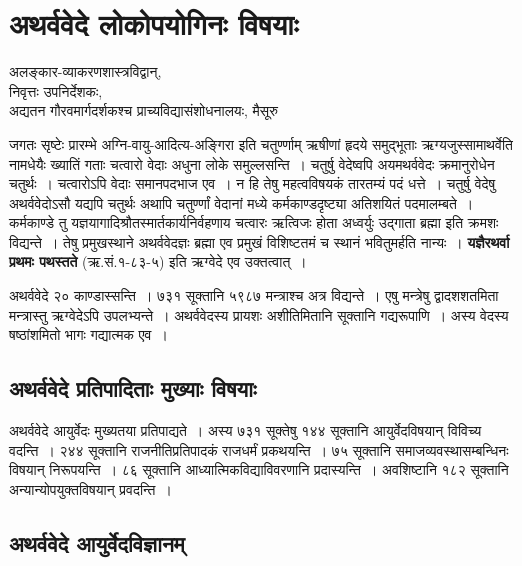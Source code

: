 \chapter{अथर्ववेदे लोकोपयोगिनः विषयाः}

\begin{center}
\smallskip

अलङ्कार-व्याकरणशास्त्रविद्वान्,\\ 
निवृत्तः उपनिर्देशकः, \\
अद्यतन गौरवमार्गदर्शकश्च प्राच्यविद्यासंशोधनालयः, मैसूरु
\addrule
\end{center}


जगतः सृष्टेः प्रारम्भे अग्नि-वायु-आदित्य-अङ्गिरा इति चतुर्ण्णाम् ऋषीणां हृदये समुद्भूताः ऋग्यजुस्सामाथर्वेति नामधेयैः ख्यातिं गताः चत्वारो वेदाः अधुना लोके समुल्लसन्ति~। चतुर्षु वेदेष्वपि अयमथर्ववेदः क्रमानुरोधेन चतुर्थः~। चत्वारोऽपि वेदाः समानपदभाज एव~। न हि तेषु महत्वविषयकं तारतम्यं पदं धत्ते~। चतुर्षु वेदेषु अथर्ववेदोऽसौ यद्यपि चतुर्थः अथापि चतुर्ण्णां वेदानां मध्ये कर्मकाण्डदृष्ट्या अतिशयितं पदमालम्बते~। कर्मकाण्डे तु यज्ञयागादिश्रौतस्मार्तकार्यनिर्वहणाय चत्वारः ऋत्विजः होता अध्वर्युः उद्गाता ब्रह्मा इति क्रमशः विद्यन्ते~। तेषु प्रमुखस्थाने अथर्ववेदज्ञः ब्रह्मा एव प्रमुखं विशिष्टतमं च स्थानं भवितुमर्हति नान्यः~। \textbf{यज्ञैरथर्वा प्रथमः पथस्तते} (ऋ.सं.१-८३-५) इति ऋग्वेदे एव उक्तत्वात्~।

अथर्ववेदे २० काण्डास्सन्ति~। ७३१ सूक्तानि ५९८७ मन्त्राश्च अत्र विद्यन्ते~। एषु मन्त्रेषु द्वादशशतमिता मन्त्रास्तु ऋग्वेदेऽपि उपलभ्यन्ते~। अथर्ववेदस्य प्रायशः अशीतिमितानि सूक्तानि गद्यरूपाणि~। अस्य वेदस्य षष्ठांशमितो भागः गद्यात्मक एव~।

\section*{अथर्ववेदे प्रतिपादिताः मुख्याः विषयाः}

अथर्ववेदे आयुर्वेदः मुख्यतया प्रतिपाद्यते~। अस्य ७३१ सूक्तेषु १४४ सूक्तानि आयुर्वेदविषयान् विविच्य वदन्ति~। २४४ सूक्तानि राजनीतिप्रतिपादकं राजधर्मं प्रकथयन्ति~। ७५ सूक्तानि समाजव्यवस्थासम्बन्धिनः विषयान् निरूपयन्ति~। ८६ सूक्तानि आध्यात्मिकविद्याविवरणानि प्रदास्यन्ति~। अवशिष्टानि १८२ सूक्तानि अन्यान्योपयुक्तविषयान् प्रवदन्ति~।

\section*{अथर्ववेदे आयुर्वेदविज्ञानम्}


